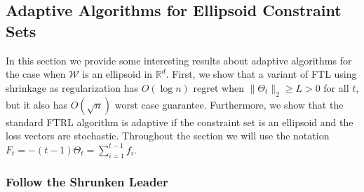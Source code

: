 \documentclass[english]{article}
\newcommand{\cW}{\mathcal{W}}
\newcommand{\R}{\mathbb{R}}
\begin{document}
\subsection{Adaptive Algorithms for Ellipsoid Constraint Sets}

In this section we provide some interesting results about adaptive algorithms for the case when $\cW$ is an ellipsoid in $\R^d$. First, we show that a variant of FTL using shrinkage as regularization has $O(\log n)$ regret when $\|\Theta_t\|_2 \ge L>0$ for all $t$, but it also has $O(\sqrt{n})$ worst case guarantee. Furthermore, we show that the standard FTRL algorithm is adaptive if the constraint set is an ellipsoid and the loss vectors are stochastic.
Throughout the section we will use the notation $F_t=-(t-1)\Theta_t=\sum_{i=1}^{t-1} f_i$.

\subsubsection{Follow the Shrunken Leader}
\end{document}
